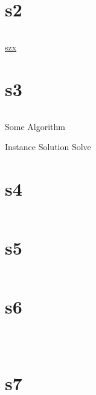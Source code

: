 \documentclass{article}
\begin{document}
\section{s2}
\label{s2}
\begin{equation}
\label{e2}
\end{equation}

\href{http://suzhouxing.github.io}{szx}

\section{s3}
\label{s3}
\begin{equation}
\label{e3}
\end{equation}

\begin{algorithm}
	\caption{Some Algorithm}{\label{alg:a2}}
	\begin{algorithmic}[1]
		\REQUIRE Instance
		\ENSURE Solution
        \STATE Solve
	\end{algorithmic}
\end{algorithm}

\section{s4}
\label{s4}
\begin{equation}
\label{e4}
\end{equation}

\section{s5}
\label{s5}
\begin{equation}
\label{e5}
\end{equation}

\section{s6}
\label{s6}
\begin{equation}
\label{e6}
\end{equation}

\begin{equation}
\label{e7}
\end{equation}

\begin{equation}
\label{e8}
\end{equation}

\section{s7}
\label{s7}
\end{document}

